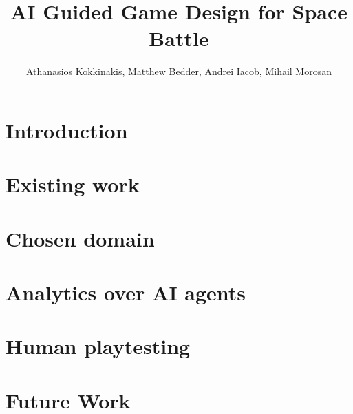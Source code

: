 \documentclass[9pt]{IEEEtran}
\title{AI Guided Game Design for Space Battle}
\author{Athanasios Kokkinakis, Matthew Bedder, Andrei Iacob, Mihail Morosan}
\begin{document}
\maketitle
\section{Introduction}

\section{Existing work}

\section{Chosen domain}

\section{Analytics over AI agents}

\section{Human playtesting}

\section{Future Work}


\printbibliography[heading=bibnumbered]
\end{document}
